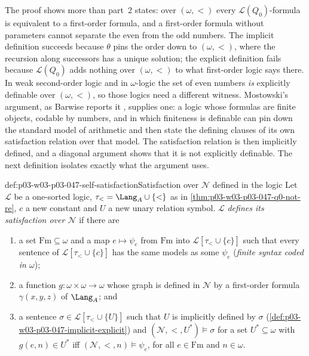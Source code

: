 The proof shows more than part~2 states: over \((\omega,<)\) every
\(\mathscr L(Q_0)\)-formula is equivalent to a first-order formula, and a
first-order formula without parameters cannot separate the even from the odd
numbers.  The implicit definition succeeds because \(\theta\) pins the order
down to \((\omega,<)\), where the recursion along successors has a unique
solution; the explicit definition fails because \(\mathscr L(Q_0)\) adds
nothing over \((\omega,<)\) to what first-order logic says there.  In weak
second-order logic and in \(\omega\)-logic the set of even numbers \emph{is}
explicitly definable over \((\omega,<)\), so those logics need a different
witness.  Mostowski's argument, as Barwise reports it
\cite[Ch.~I, \S1.6, p.~10]{Barwise1985BackgroundAims}, supplies one: a logic
whose formulas are finite objects, codable by numbers, and in which finiteness
is definable can pin down the standard model of arithmetic and then state
the defining clauses of its own satisfaction relation over that model.  The
satisfaction relation is then implicitly defined, and a diagonal argument
shows that it is not explicitly definable.  The next definition isolates
exactly what the argument uses.

\begin{hbdefinition}{def:p03-w03-p03-047-self-satisfaction}{Satisfaction over \(\mathcal N\) defined in the logic}
Let \(\mathscr L\) be a one-sorted logic, \(\tau_<=\Lang_A\cup\{<\}\) as in
\cref{thm:p03-w03-p03-047-q0-not-re}, \(c\) a new constant and \(U\) a new
unary relation symbol.  \(\mathscr L\) \emph{defines its satisfaction over
\(\mathcal N\)} if there are
\begin{enumerate}
 \item[(a)] a set \(\mathrm{Fm}\subseteq\omega\) and a map
       \(e\mapsto\psi_e\) from \(\mathrm{Fm}\) into
       \(\mathscr L[\tau_<\cup\{c\}]\) such that every sentence of
       \(\mathscr L[\tau_<\cup\{c\}]\) has the same models as some
       \(\psi_e\) (\emph{finite syntax coded in \(\omega\)});
 \item[(b)] a function \(g:\omega\times\omega\to\omega\) whose graph is
       defined in \(\mathcal N\) by a first-order formula
       \(\gamma(x,y,z)\) of \(\Lang_A\); and
 \item[(c)] a sentence \(\sigma\in\mathscr L[\tau_<\cup\{U\}]\) such that
       \(U\) is implicitly defined by \(\sigma\)
       (\cref{def:p03-w03-p03-047-implicit-explicit}) and
       \((\mathcal N,<,U^\ast)\models\sigma\) for a set \(U^\ast\subseteq\omega\)
       with \(g(e,n)\in U^\ast\) iff \((\mathcal N,<,n)\models\psi_e\), for all
       \(e\in\mathrm{Fm}\) and \(n\in\omega\).
\end{enumerate}
\end{hbdefinition}

